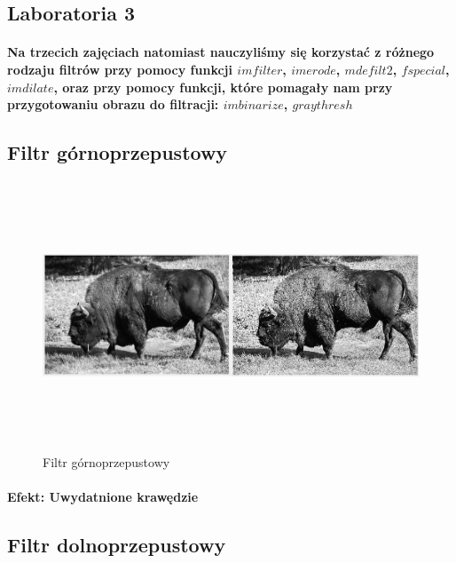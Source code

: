 \documentclass[a4paper,12pt]{article}
\begin{document}
\begin{justify}
\section{Laboratoria 3}

\paragraph{Na trzecich zajęciach natomiast nauczyliśmy się korzystać z różnego rodzaju filtrów przy pomocy funkcji $imfilter$, $imerode$, $mdefilt2$, $fspecial$, $imdilate$, oraz przy pomocy funkcji, które pomagały nam przy przygotowaniu obrazu do filtracji: $imbinarize$, $graythresh$}

\subsection{Filtr górnoprzepustowy}

\begin{figure}[h!]
\centering
\includegraphics[width=18cm, height=8cm]{5}
\caption{Filtr górnoprzepustowy}
\end{figure}

\newpage

\paragraph{Efekt: Uwydatnione krawędzie}

\subsection{Filtr dolnoprzepustowy}


\end{justify}
\end{document}
